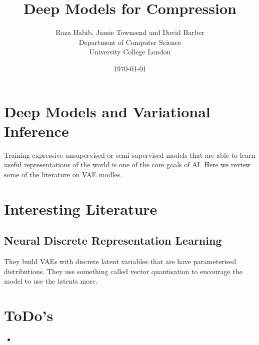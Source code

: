 \documentclass[11pt,fleqn,fancyheadings,a4paper]{article}
\title{Deep Models for Compression}
\author{Raza Habib, Jamie Townsend and David Barber\\Department of Computer Science\\University College London}
\date{\today}
\begin{document}
\maketitle

\section{Deep Models and Variational Inference}

Training expressive unsupervised or semi-supervised models that are able to learn useful representations of the world is one of the core goals of AI. Here we review some of the literature on VAE modles.

\section{Interesting Literature}

\subsection{Neural Discrete Representation Learning}

They build VAEs with discrete latent variables that are have parameterised distributions. They use something called vector quantisation to encourage the model to use the latents more.


\section{ToDo's}
\begin{itemize}
	\item
\end{itemize}




\end{document}
